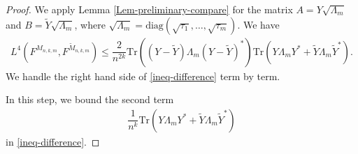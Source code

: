 \documentclass[12pt]{article}
\numberwithin{equation}{section} \theoremstyle{plain}
\def\Tr{\mathrm {Tr}}
\def\diag{\mathrm {diag}}
\begin{document}
\begin{proof}
We apply Lemma \ref{Lem-preliminary-compare} for the matrix $A = Y \sqrt{\Lambda_m}$ and $B = \widetilde Y \sqrt{\Lambda_m}$, where $\sqrt{\Lambda_m} = \diag(\sqrt{\tau_1},\ldots,\sqrt{\tau_m})$. We have
\begin{align} \label{ineq-difference}
    L^4 \left( F^{M_{n,k,m}}, F^{\widetilde M_{n,k,m}} \right)
    \le \dfrac{2}{n^{2k}} \Tr \left( \left( Y - \widetilde Y \right) \Lambda_m \left( Y - \widetilde Y \right)^* \right) \Tr \left( Y \Lambda_m Y^* + \widetilde Y \Lambda_m \widetilde Y^* \right).
\end{align}
We handle the right hand side of \eqref{ineq-difference} term by term.

\bigskip

 In this step, we bound the second term
\begin{align*}
    \dfrac{1}{n^k} \Tr \left( Y \Lambda_m Y^* + \widetilde Y \Lambda_m \widetilde Y^* \right)
\end{align*}
in \eqref{ineq-difference}.


\end{proof}
\end{document}
